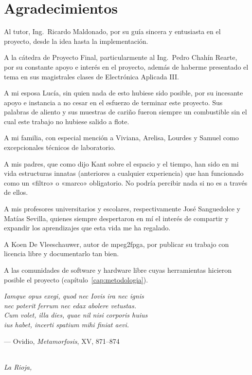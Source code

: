 \chapter*{Agradecimientos}

Al tutor, Ing.~Ricardo Maldonado, por su guía sincera y entusiasta en el
proyecto, desde la idea hasta la implementación.

A la cátedra de Proyecto Final, particularmente al Ing.~Pedro Chahín Rearte,
por su constante apoyo e interés en el proyecto, además de haberme presentado
el tema en sus magistrales clases de Electrónica Aplicada III.

A mi esposa Lucía, sin quien nada de esto hubiese sido posible, por su
incesante apoyo e instancia a no cesar en el esfuerzo de terminar este
proyecto. Sus palabras de aliento y sus muestras de cariño fueron siempre un
combustible sin el cual este trabajo no hubiese salido a flote.

A mi familia, con especial mención a Viviana, Arelisa, Lourdes y Samuel como
excepcionales técnicos de laboratorio.

A mis padres, que como dijo Kant sobre el espacio y el tiempo, han sido en mi
vida estructuras innatas (anteriores a cualquier experiencia) que han
funcionado como un «filtro» o «marco» obligatorio. No podría percibir nada si
no es a través de ellos.

A mis profesores universitarios y escolares, respectivamente José Sanguedolce
y Matías Sevilla, quienes siempre despertaron en mí el interés de compartir y
expandir los aprendizajes que esta vida me ha regalado.

A Koen De Vleeschauwer, autor de mpeg2fpga, por publicar su trabajo con
licencia libre y documentarlo tan bien.

A las comunidades de software y hardware libre cuyas herramientas hicieron
posible el proyecto (capítulo~\ref{cap:metodologia}).

\vfill
\begin{center}
  \begin{minipage}{0.78\linewidth}
    \itshape\small
    Iamque opus exegi, quod nec Iovis ira nec ignis\\
    nec poterit ferrum nec edax abolere vetustas.\\
    Cum volet, illa dies, quae nil nisi corporis huius\\
    ius habet, incerti spatium mihi finiat aevi.

    \smallskip
    \upshape\raggedleft --- Ovidio, \emph{Metamorfosis}, XV, 871--874
  \end{minipage}
\end{center}
\vfill

\begin{flushright}
  \itshape \autor\\
  La Rioja, \fechaentrega
\end{flushright}
